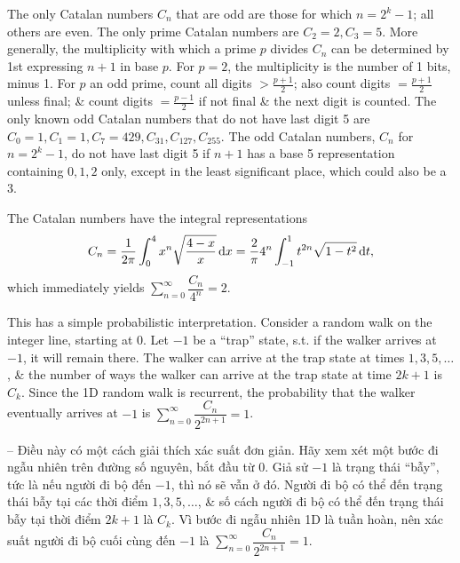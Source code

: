 \documentclass[oneside]{book}
\begin{document}
The only Catalan numbers $C_n$ that are odd are those for which $n = 2^k - 1$; all others are even. The only prime Catalan numbers are $C_2 = 2,C_3 = 5$. More generally, the multiplicity with which a prime $p$ divides $C_n$ can be determined by 1st expressing $n + 1$ in base $p$. For $p = 2$, the multiplicity is the number of 1 bits, minus 1. For $p$ an odd prime, count all digits $> \frac{p + 1}{2}$; also count digits $= \frac{p + 1}{2}$ unless final; \& count digits $= \frac{p - 1}{2}$ if not final \& the next digit is counted. The only known odd Catalan numbers that do not have last digit 5 are $C_0 = 1,C_1 = 1,C_7 = 429,C_{31},C_{127},C_{255}$. The odd Catalan numbers, $C_n$ for $n = 2^k - 1$, do not have last digit 5 if $n + 1$ has a base 5 representation containing $0,1,2$ only, except in the least significant place, which could also be a 3.

The Catalan numbers have the integral representations
\begin{equation*}
	C_n = \frac{1}{2\pi}\int_0^4 x^n\sqrt{\frac{4 - x}{x}}\,{\rm d}x = \frac{2}{\pi}4^n\int_{-1}^1 t^{2n}\sqrt{1 - t^2}\,{\rm d}t,
\end{equation*}
which immediately yields $\sum_{n=0}^\infty \dfrac{C_n}{4^n} = 2$.

This has a simple probabilistic interpretation. Consider a random walk on the integer line, starting at 0. Let $-1$ be a ``trap'' state, s.t. if the walker arrives at $-1$, it will remain there. The walker can arrive at the trap state at times $1,3,5,\ldots$, \& the number of ways the walker can arrive at the trap state at time $2k + 1$ is $C_k$. Since the 1D random walk is recurrent, the probability that the walker eventually arrives at $-1$ is $\sum_{n=0}^\infty \dfrac{C_n}{2^{2n + 1}} = 1$.

-- Điều này có một cách giải thích xác suất đơn giản. Hãy xem xét một bước đi ngẫu nhiên trên đường số nguyên, bắt đầu từ 0. Giả sử $-1$ là trạng thái ``bẫy'', tức là nếu người đi bộ đến $-1$, thì nó sẽ vẫn ở đó. Người đi bộ có thể đến trạng thái bẫy tại các thời điểm $1,3,5,\ldots$, \& số cách người đi bộ có thể đến trạng thái bẫy tại thời điểm $2k + 1$ là $C_k$. Vì bước đi ngẫu nhiên 1D là tuần hoàn, nên xác suất người đi bộ cuối cùng đến $-1$ là $\sum_{n=0}^\infty \dfrac{C_n}{2^{2n + 1}} = 1$.

\end{document}
